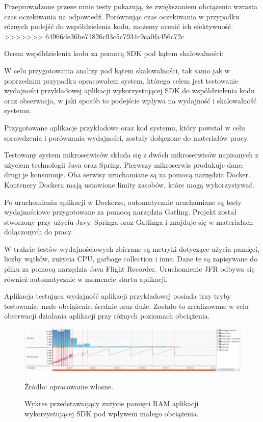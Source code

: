 \documentclass[runningheads,12pt]{llncs}
\begin{document}
\newpage

Przeprowadzone przeze mnie testy pokazują, że zwiększaniem obciążenia wzrasta czas oczekiwania na odpowiedź. Porównując czas oczekiwania w przypadku różnych podejść do współdzielenia kodu, możemy ocenić ich efektywność.
>>>>>>> 64966de36be71826c93c5c7934c9ca0fa456c72c

Ocena współdzielenia kodu za pomocą SDK pod kątem skalowalności:

W celu przygotowania analizy pod kątem skalowalności, tak samo jak w poprzednim przypadku opracowałem system, którego celem jest testowanie wydajności przykładowej aplikacji wykorzystującej SDK do współdzielenia kodu oraz obserwacja, w jaki sposób to podejście wpływa na wydajność i skalowalność systemu.

Przygotowane aplikacje przykładowe oraz kod systemu, który powstał w celu sprawdzenia i porównania wydajności, zostały dołączone do materiałów pracy.

Testowany system mikroserwisów składa się z dwóch mikroserwisów napisanych z użyciem technologii Java oraz Spring. Pierwszy mikroserwis produkuje dane, drugi je konsumuje. Oba serwisy uruchamiane są za pomocą narzędzia Docker. Kontenery Dockera mają ustawione limity zasobów, które mogą wykorzystywać.

Po uruchomieniu aplikacji w Dockerze, automatycznie uruchamiane są testy wydajnościowe przygotowane za pomocą narzędzia Gatling. Projekt został stworzony przy użyciu Javy, Springa oraz Gatlinga i znajduje się w materiałach dołączonych do pracy.

W trakcie testów wydajnościowych zbierane są metryki dotyczące użycia pamięci, liczby wątków, zużycia CPU, garbage collection i inne. Dane te są zapisywane do pliku za pomocą narzędzia Java Flight Recorder. Uruchomienie JFR odbywa się również automatycznie w momencie startu aplikacji.

Aplikacja testująca wydajność aplikacji przykładowej posiada trzy tryby testowania: małe obciążenie, średnie oraz duże. Zostało to zrealizowane w celu obserwacji działania aplikacji przy różnych poziomach obciążenia.

\newpage


\begin{figure}
    \includegraphics[width=\linewidth]{images/sdk-memory-low-graph.jpg}
    \caption{Wykres przedstawiający zużycie pamięci  RAM aplikacji wykorzystującej SDK pod wpływem małego obciążenia.} \label{fig1}
    \vspace{0.5em}
    {\small Źródło: opracowanie własne.}
\end{figure}
\end{document}
